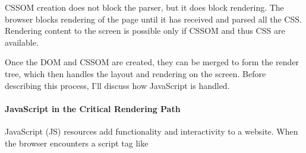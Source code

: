 

CSSOM creation does not block the parser, but it does block rendering.
The browser blocks rendering of the page until it has received and parsed all the CSS.
Rendering content to the screen is possible only if CSSOM and thus CSS are available. 



Once the DOM and CSSOM are created, they can be merged to form the render tree, which then handles the layout and rendering on the screen.
Before describing this process, I'll discuss how JavaScript is handled.








\paragraph{JavaScript in the Critical Rendering Path} %


JavaScript (JS) resources add functionality and interactivity to a website.
When the browser encounters a script tag like

